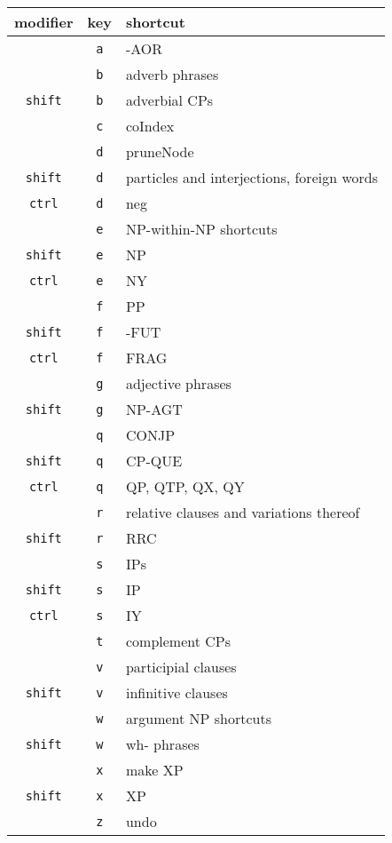 \documentclass[10pt]{article}
\begin{document}
\begin{multicols}{2}
\begin{tabular}{c c l}
\hline
modifier & key & shortcut\\
\hline
\hline
& \texttt{a} & -AOR\\
\hline
& \texttt{b} & adverb phrases\\
\texttt{shift} & \texttt{b} & adverbial CPs\\
\hline
& \texttt{c} & coIndex\\
\hline
& \texttt{d} & pruneNode\\
\texttt{shift} & \texttt{d} & particles and interjections, foreign words\\
\texttt{ctrl} & \texttt{d} & neg\\
\hline
& \texttt{e} & NP-within-NP shortcuts\\
\texttt{shift} & \texttt{e} & NP\\
\texttt{ctrl} & \texttt{e} & NY\\
\hline
& \texttt{f} & PP\\
\texttt{shift} & \texttt{f} & -FUT\\
\texttt{ctrl} & \texttt{f} & FRAG\\
\hline
& \texttt{g} & adjective phrases\\
\texttt{shift} & \texttt{g} & NP-AGT\\
\hline
& \texttt{q} & CONJP\\
\texttt{shift} & \texttt{q} & CP-QUE\\
\texttt{ctrl} & \texttt{q} & QP, QTP, QX, QY\\
\hline
& \texttt{r} & relative clauses and variations thereof\\
\texttt{shift} & \texttt{r} & RRC\\
\hline
& \texttt{s} & IPs\\
\texttt{shift} & \texttt{s} & IP\\
\texttt{ctrl} & \texttt{s} & IY\\
\hline
& \texttt{t} & complement CPs\\
\hline
& \texttt{v} & participial clauses\\
\texttt{shift} & \texttt{v} & infinitive clauses\\
\hline
& \texttt{w} & argument NP shortcuts\\
\texttt{shift} & \texttt{w} & wh- phrases\\
\hline
& \texttt{x} & make XP\\
\texttt{shift} & \texttt{x} & XP\\
\hline
& \texttt{z} & undo\\
\hline
\end{tabular}


\end{multicols}
\end{document}

